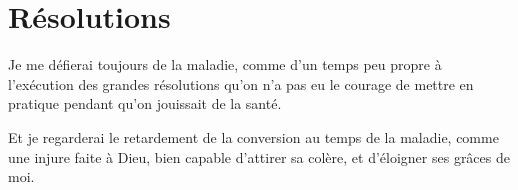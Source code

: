 \documentclass[instructions.tex]{subfiles}
\begin{document}
\section{Résolutions}

\primo Je me défierai toujours de la maladie, comme d’un temps peu propre à l’exécution des grandes résolutions qu’on n’a pas eu le courage de mettre en pratique pendant qu’on jouissait de la santé.

\secundo Et je regarderai le retardement de la conversion au temps de la maladie, comme une injure faite à Dieu, bien capable d’attirer sa colère, et d’éloigner ses grâces de moi.

\end{document}
